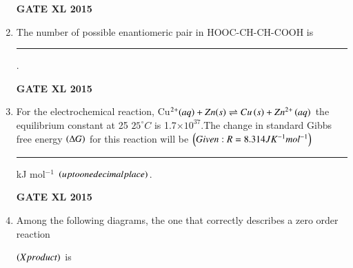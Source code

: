 \documentclass[journal,12pt,onecolumn]{IEEEtran}
\begin{document}
\begin{enumerate}
\begin{enumerate}
    \end{enumerate}
\begin{flushright}\textbf{GATE XL 2015}\end{flushright}
\item The number of possible enantiomeric pair in HOOC-CH-CH-COOH is \rule{1cm}{0.15mm}.
\begin{flushright}\textbf{GATE XL 2015}\end{flushright}
\item For the electrochemical reaction, Cu$^{2+}\textit{\ensuremath{\left(aq\right)}}+Zn\textit{\ensuremath{\left(s\right)}} \rightleftharpoons Cu\left(s\right) +Zn^{2+} \left(aq\right)$ the equilibrium constant at 25 $25^{\circ} C$ is 1.7$\times 10 ^{37}$.The change in standard Gibbs free energy $\left(\Delta G\right)$ for this reaction will be $\left(Given: R = 8.314JK ^ {- 1} mol ^{- 1} \right)$\rule{1cm}{0.15mm} kJ mol$^{-1}$ $\left(up to one decimal place\right)$.
\begin{flushright}\textbf{GATE XL 2015}\end{flushright}
\item Among the following diagrams, the one that correctly describes a zero order reaction

$\left(X product\right)$ is


\end{enumerate}
\end{document}
